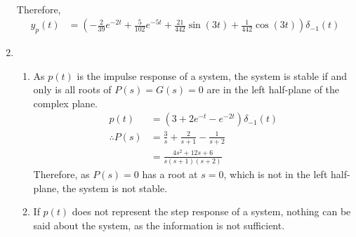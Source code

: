 \documentclass[fleqn, a4paper, 11pt, oneside]{amsart}
\theoremstyle{definition}
\theoremstyle{theorem}
\begin{document}
\begin{solution}
\begin{enumerate}
\begin{align*}
			\end{align*}
			Therefore,
			\begin{align*}
				y_p(t) & = \left( -\frac{2}{39} e^{-2 t} + \frac{5}{102} e^{-5 t} + \frac{21}{442} \sin(3 t) + \frac{1}{442} \cos(3 t) \right) \delta_{-1}(t)
			\end{align*}
		\item
			\begin{enumerate}
				\item
					As $p(t)$ is the impulse response of a system, the system is stable if and only is all roots of $P(s) = G(s) = 0$ are in the left half-plane of the complex plane.
					\begin{align*}
						p(t)            & = \left( 3 + 2 e^{-t} - e^{-2 t} \right) \delta_{-1}(t) \\
						\therefore P(s) & = \frac{3}{s} + \frac{2}{s + 1} - \frac{1}{s + 2}       \\
                                                                & = \frac{4 s^2 + 12 s + 6}{s (s + 1) (s + 2)}
					\end{align*}
					Therefore, as $P(s) = 0$ has a root at $s = 0$, which is not in the left half-plane, the system is not stable.
				\item
					If $p(t)$ does not represent the step response of a system, nothing can be said about the system, as the information is not sufficient.
			\end{enumerate}
	\end{enumerate}
\end{solution}
\end{document}
